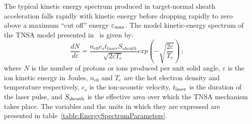 The typical kinetic energy spectrum produced in target-normal sheath
acceleration falls rapidly with kinetic energy before dropping rapidly
to zero above a maximum ``cut off'' energy $\varepsilon_{\rm max}$.
The model kinetic-energy spectrum of the TNSA model presented
in~\cite{10.1038/nphys199} is given by:
\begin{equation}
  \frac{dN}{d\varepsilon} = \frac{n_{e0} c_{s} t_{laser} S_{sheath}}
                                 {\sqrt{2\varepsilon T_{e}}}
                                 exp(- \sqrt{\frac{2\varepsilon}{T_{e}}})\,;
  \label{Eq:Spct:0}
\end{equation}
where $N$ is the number of protons or ions produced per unit solid
angle, $\varepsilon$ is the ion kinetic energy in Joules, $n_{e0}$ and
$T_e$ are the hot electron density and temperature respectively, $c_s$
is the ion-acoustic velocity, $t_{\rm laser}$ is the duration of the
laser pulse, and $S_{\rm sheath}$ is the effective area over which the
TNSA mechanism takes place.
The variables and the units in which they are expressed are presented
in table~\ref{table:EnergySpectrumParameters}.
